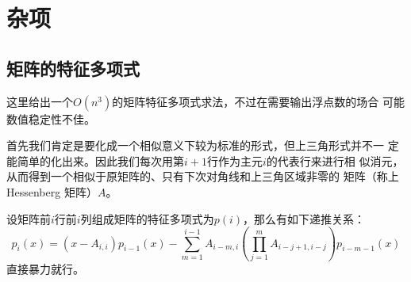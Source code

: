 \chapter{杂项}
\section{矩阵的特征多项式}
这里给出一个$O(n^3)$的矩阵特征多项式求法，不过在需要输出浮点数的场合
可能数值稳定性不佳。\par
首先我们肯定是要化成一个相似意义下较为标准的形式，但上三角形式并不一
定能简单的化出来。因此我们每次用第$i+1$行作为主元$i$的代表行来进行相
似消元，从而得到一个相似于原矩阵的、只有下次对角线和上三角区域非零的
矩阵（称上 Hessenberg 矩阵）$A$。\par
设矩阵前$i$行前$i$列组成矩阵的特征多项式为$p(i)$，那么有如下递推关系：
\[p_i(x)=(x-A_{i,i})p_{i-1}(x)-\sum_{m=1}^{i - 1}A_{i - m,i}(\prod_{j=1}^m A_{i-j+1,i-j}) p_{i - m - 1}(x)\]
直接暴力就行。


